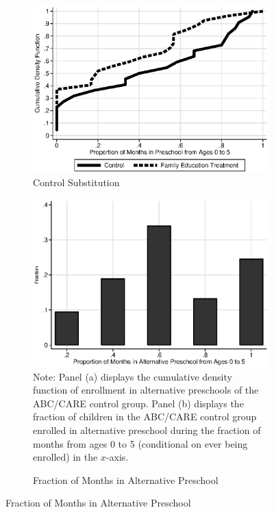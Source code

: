 \begin{figure}[H]
\centering
\caption{Control Substitution Characteristics, ABC/CARE Control Group}\label{fig:control-sub}
\begin{subfigure}[h]{0.7\textwidth}
		\centering
		\caption{Control Substitution} \label{fig:treatsubcare}
		\includegraphics[width=\textwidth]{output/care_controlcontamination_months.eps}
\end{subfigure}

\begin{subfigure}[h]{0.7\textwidth}
	\centering
	\caption{Fraction of Months in Alternative Preschool} \label{fig:proportion-alt-pre}
		\includegraphics[width=\textwidth]{output/abccare_Vfractimes.eps}
\footnotesize
\justify
Note: Panel (a) displays the cumulative density function of enrollment in alternative preschools of the ABC/CARE control group. Panel (b) displays the fraction of children in the ABC/CARE control group enrolled in alternative preschool during the fraction of months from ages 0 to 5 (conditional on ever being enrolled) in the $x$-axis.
\end{subfigure}
\end{figure}

